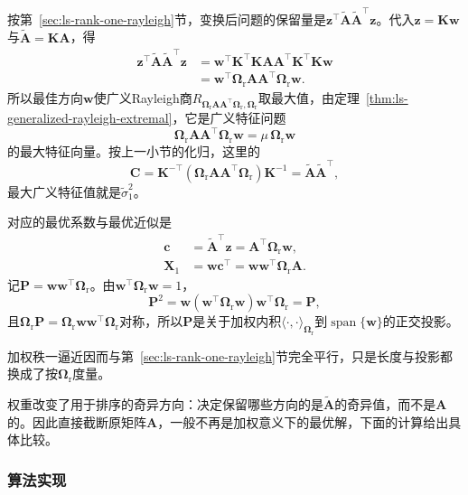 按第~\ref{sec:ls-rank-one-rayleigh}节，变换后问题的保留量是$\bm z^\top\widetilde{\bm A}\widetilde{\bm A}^\top\bm z$。代入$\bm z=\bm K\bm w$与$\widetilde{\bm A}=\bm K\bm A$，得
\[
 \begin{aligned}
 \bm z^\top\widetilde{\bm A}\widetilde{\bm A}^\top\bm z
 &=\bm w^\top\bm K^\top\bm K\bm A\bm A^\top\bm K^\top\bm K\bm w\\
 &=\bm w^\top\bm\Omega_{\mathrm r}\bm A\bm A^\top\bm\Omega_{\mathrm r}\bm w .
 \end{aligned}
\]
所以最佳方向$\bm w$使广义Rayleigh商$R_{\bm\Omega_{\mathrm r}\bm A\bm A^\top\bm\Omega_{\mathrm r},\bm\Omega_{\mathrm r}}$取最大值，由定理~\ref{thm:ls-generalized-rayleigh-extremal}，它是广义特征问题
\begin{equation}
 \bm\Omega_{\mathrm r}\bm A\bm A^\top\bm\Omega_{\mathrm r}\bm w=\mu\,\bm\Omega_{\mathrm r}\bm w
 \label{eq:matrix-approximation-weighted-direction}
\end{equation}
的最大特征向量。按上一小节的化归，这里的
\[
 \bm C=\bm K^{-\top}(\bm\Omega_{\mathrm r}\bm A\bm A^\top\bm\Omega_{\mathrm r})\bm K^{-1}=\widetilde{\bm A}\widetilde{\bm A}^\top ,
\]
最大广义特征值就是$\tilde\sigma_1^2$。

对应的最优系数与最优近似是
\begin{equation}
 \begin{aligned}
 \bm c&=\widetilde{\bm A}^\top\bm z=\bm A^\top\bm\Omega_{\mathrm r}\bm w,\\
 \bm X_1&=\bm w\bm c^\top=\bm w\bm w^\top\bm\Omega_{\mathrm r}\bm A .
 \end{aligned}
 \label{eq:matrix-approximation-weighted-rank-one-optimum}
\end{equation}
记$\bm P=\bm w\bm w^\top\bm\Omega_{\mathrm r}$。由$\bm w^\top\bm\Omega_{\mathrm r}\bm w=1$，
\[
 \bm P^2=\bm w(\bm w^\top\bm\Omega_{\mathrm r}\bm w)\bm w^\top\bm\Omega_{\mathrm r}=\bm P ,
\]
且$\bm\Omega_{\mathrm r}\bm P=\bm\Omega_{\mathrm r}\bm w\bm w^\top\bm\Omega_{\mathrm r}$对称，所以$\bm P$是关于加权内积$\langle\cdot,\cdot\rangle_{\bm\Omega_{\mathrm r}}$到$\operatorname{span}\{\bm w\}$的正交投影。

加权秩一逼近因而与第~\ref{sec:ls-rank-one-rayleigh}节完全平行，只是长度与投影都换成了按$\bm\Omega_{\mathrm r}$度量。

权重改变了用于排序的奇异方向：决定保留哪些方向的是$\widetilde{\bm A}$的奇异值，而不是$\bm A$的。因此直接截断原矩阵$\bm A$，一般不再是加权意义下的最优解，下面的计算给出具体比较。

\subsubsection{算法实现}

